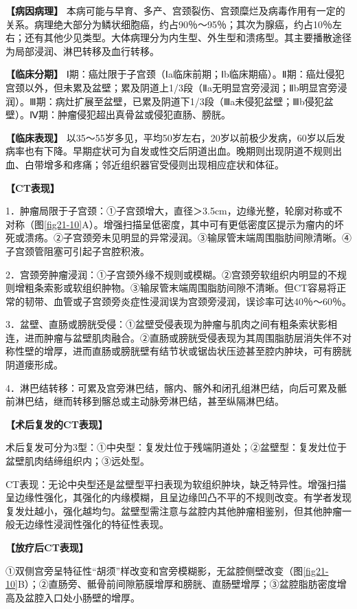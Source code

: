 \textbf{【病因病理】}
本病可能与早育、多产、宫颈裂伤、宫颈糜烂及病毒作用有一定的关系。病理绝大部分为鳞状细胞癌，约占90％～95％；其次为腺癌，约占10％左右；还有其他少见类型。大体病理分为内生型、外生型和溃疡型。其主要播散途径为局部浸润、淋巴转移及血行转移。

\textbf{【临床分期】}
Ⅰ期：癌灶限于子宫颈（Ⅰa临床前期；Ⅰb临床期癌）。Ⅱ期：癌灶侵犯宫颈以外，但未累及盆壁；累及阴道上1/3段（Ⅱa无明显宫旁浸润；Ⅱb明显宫旁浸润）。Ⅲ期：病灶扩展至盆壁，已累及阴道下1/3段（Ⅲa未侵犯盆壁；Ⅲb侵犯盆壁）。Ⅳ期：肿瘤侵犯超出真骨盆或侵犯直肠、膀胱。

\textbf{【临床表现】}
以35～55岁多见，平均50岁左右，20岁以前极少发病，60岁以后发病率也有下降。早期症状可为自发或性交后阴道出血。晚期则出现阴道不规则出血、白带增多和疼痛；邻近组织器官受侵则出现相应症状和体征。

\textbf{【CT表现】}

1．肿瘤局限于子宫颈：①子宫颈增大，直径＞3.5cm，边缘光整，轮廓对称或不对称（图\ref{fig21-10}A）。增强扫描呈低密度，其中可有更低密度区提示为瘤内的坏死或溃疡。②子宫颈旁未见明显的异常浸润。③输尿管末端周围脂肪间隙清晰。④子宫颈管阻塞可引起子宫腔积液。

2．宫颈旁肿瘤浸润：①子宫颈外缘不规则或模糊。②宫颈旁软组织内明显的不规则增粗条索影或软组织肿物。③输尿管末端周围脂肪间隙不清晰。但CT容易将正常的韧带、血管或子宫颈旁炎症性浸润误为宫颈旁浸润，误诊率可达40％～60％。

3．盆壁、直肠或膀胱受侵：①盆壁受侵表现为肿瘤与肌肉之间有粗条索状影相连，进而肿瘤与盆壁肌肉融合。②直肠或膀胱受侵表现为其周围脂肪层消失伴不对称性壁的增厚，进而直肠或膀胱壁有结节状或锯齿状压迹甚至腔内肿块，可有膀胱阴道瘘形成。

4．淋巴结转移：可累及宫旁淋巴结，髂内、髂外和闭孔组淋巴结，向后可累及骶前淋巴结，继而转移到髂总或主动脉旁淋巴结，甚至纵隔淋巴结。

\textbf{【术后复发的CT表现】}

术后复发可分为3型：①中央型：复发灶位于残端阴道处；②盆壁型：复发灶位于盆壁肌肉结缔组织内；③远处型。

CT表现：无论中央型还是盆壁型平扫表现为软组织肿块，缺乏特异性。增强扫描呈边缘性强化，其强化的内缘模糊，且呈边缘凹凸不平的不规则改变。有学者发现复发灶越小，强化越均匀。盆壁型需注意与盆腔内其他肿瘤相鉴别，但其他肿瘤一般无边缘性浸润性强化的特征性表现。

\textbf{【放疗后CT表现】}

①双侧宫旁呈特征性“胡须”样改变和宫旁模糊影，无盆腔侧壁改变（图\ref{fig21-10}B）；②直肠旁、骶骨前间隙筋膜增厚和膀胱、直肠壁增厚；③盆腔脂肪密度增高及盆腔入口处小肠壁的增厚。

